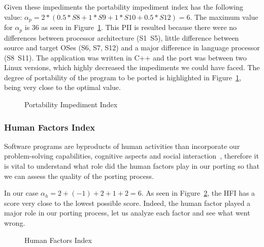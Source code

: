 Given these impediments the portability impediment index has the following
value: $\alpha_p = 2 * (0.5 * S8 + 1 * S9 + 1 * S10 + 0.5 * S12) = 6$. The
maximum value for $\alpha_p$ is 36 as seen in Figure~\ref{fig:PII}. This PII is
resulted because there were no differences between processor architecture
(S1~S5), little difference between source and target OSes (S6, S7, S12) and a
major difference in language processor (S8~S11). The application was written in
C++ and the port was between two Linux versions, which highly decreased the
impediments we could have faced. The degree of portability of the program to be
ported is highlighted in Figure~\ref{fig:PII}, being very close to the optimal
value.

\begin{figure}

    \caption{Portability Impediment Index }
    \label{fig:PII}
\end{figure}


\subsubsection{Human Factors Index}

Software programs are byproducts of human activities than incorporate our
problem-solving capabilities, cognitive aspects and social
interaction~\cite{b3}, therefore it is vital to understand what role did the
human factors play in our porting so that we can assess the quality of the
porting process. 

In our case $\alpha_h = 2 + (-1) + 2 + 1 + 2 = 6$. As seen in
Figure~\ref{fig:HFI}, the HFI has a score very close to the lowest possible
score. Indeed, the human factor played a major role in our porting process, let
us analyze each factor and see what went wrong.

\begin{figure}

    \caption{Human Factors Index }
    \label{fig:HFI}
\end{figure}

